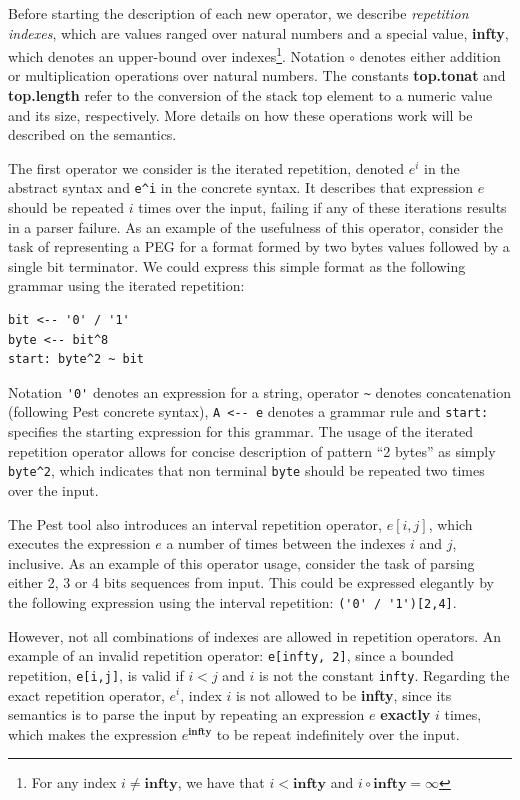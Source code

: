 \documentclass[preprint,12pt]{elsarticle}
\theoremstyle{definition}
\begin{document}
Before starting the description of each new operator, we describe
\emph{repetition indexes}, which are values ranged over natural numbers and a
special value, \textbf{infty}, which denotes an upper-bound over
indexes\footnote{For any index $i \neq \mathbf{infty}$, we have
that $i < \mathbf{infty}$ and $i \circ \mathbf{infty} = \infty$}.
Notation $\circ$ denotes either addition
or multiplication operations over natural numbers. The constants
\textbf{top.tonat} and \textbf{top.length} refer to the conversion
of the stack top element to a numeric value and its size, respectively.
More details on how these operations work will be described
on the semantics.

The first operator we consider is the iterated repetition, denoted $e^i$ in
the abstract syntax and \verb|e^i| in the concrete syntax. It describes that
expression $e$ should be repeated $i$ times over the input, failing if any of these iterations
results in a parser failure. As an example of the usefulness of this operator, consider
the task of representing a PEG for a format formed by two bytes values followed by
a single bit terminator. We could express this simple format as the following
grammar using the iterated repetition:
\begin{verbatim}
bit <-- '0' / '1'
byte <-- bit^8
start: byte^2 ~ bit
\end{verbatim}
Notation \verb|'0'| denotes an expression for a string,
operator \verb|~| denotes concatenation (following Pest concrete syntax),
\verb|A <-- e| denotes a grammar rule and \verb|start:| specifies
the starting expression for this grammar. The usage of the iterated
repetition operator allows for concise description of pattern ``2 bytes''
as simply \verb|byte^2|, which indicates that non terminal \verb|byte|
should be repeated two times over the input.

The Pest tool also introduces an interval repetition operator, $e[i,j]$,
which executes the expression $e$ a number of times between the indexes $i$
and $j$, inclusive. As an example of this operator usage, consider the
task of parsing either 2, 3 or 4 bits sequences from input. This could be
expressed elegantly by the following expression using the interval repetition:
\verb|('0' / '1')[2,4]|.

However, not all combinations of indexes are allowed in repetition operators.
An example of an invalid repetition operator: \verb|e[infty, 2]|, since a
bounded repetition, \verb|e[i,j]|, is valid if $i < j$ and $i$ is not the constant
\verb|infty|. Regarding the exact repetition operator, $e^i$, index $i$ is not allowed to
be \textbf{infty}, since its semantics is to parse the input by repeating
an expression $e$ \textbf{exactly} $i$ times, which makes the expression
$e^{\mathbf{infty}}$ to be repeat indefinitely over the input.
\end{document}
